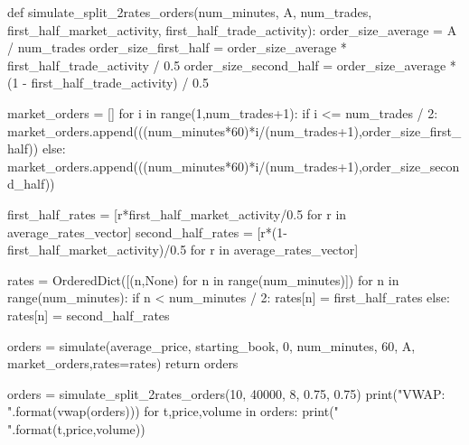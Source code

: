 def simulate_split_2rates_orders(num_minutes, A, num_trades, first_half_market_activity, first_half_trade_activity):
    order_size_average = A / num_trades
    order_size_first_half = order_size_average * first_half_trade_activity / 0.5
    order_size_second_half = order_size_average * (1 - first_half_trade_activity) / 0.5
    
    market_orders = []
    for i in range(1,num_trades+1):
        if i <= num_trades / 2:
            market_orders.append(((num_minutes*60)*i/(num_trades+1),order_size_first_half))
        else:
            market_orders.append(((num_minutes*60)*i/(num_trades+1),order_size_second_half))
            
    first_half_rates = [r*first_half_market_activity/0.5 for r in average_rates_vector]
    second_half_rates = [r*(1-first_half_market_activity)/0.5 for r in average_rates_vector]

    rates = OrderedDict([(n,None) for n in range(num_minutes)])
    for n in range(num_minutes):
        if n < num_minutes / 2:
            rates[n] = first_half_rates
        else:
            rates[n] = second_half_rates
            
    orders = simulate(average_price, starting_book, 0, num_minutes, 60, A, market_orders,rates=rates)
    return orders
    
orders = simulate_split_2rates_orders(10, 40000, 8, 0.75, 0.75)
print("VWAP: {}".format(vwap(orders)))
for t,price,volume in orders:
    print("{} {} {}".format(t,price,volume))